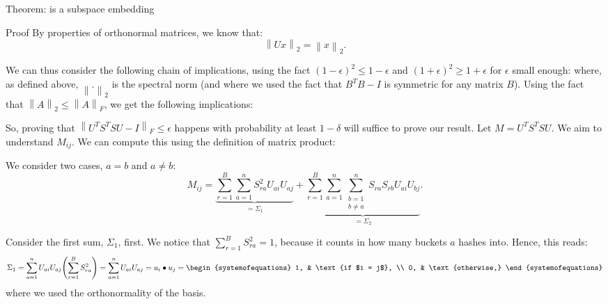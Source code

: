 \documentclass[a4paper]{article}
\begin{document}
\begin{parag}{Theorem:  is a subspace embedding}
\begin{subparag}{Proof}
        By properties of orthonormal matrices, we know that:
        \[\left\|U x\right\|_2 = \left\|x\right\|_2.\]

        We can thus consider the following chain of implications, using the fact $\left(1 - \epsilon\right)^2 \leq 1 - \epsilon$ and $\left(1 + \epsilon\right)^2 \geq 1 + \epsilon$ for $\epsilon$ small enough: 
        where, as defined above, $\left\|.\right\|_2$ is the spectral norm (and where we used the fact that $B^T B - I$ is symmetric for any matrix $B$). Using the fact that $\left\|A\right\|_2 \leq \left\|A\right\|_F$, we get the following implications: 

        So, proving that $\left\|U^T S^T S U - I\right\|_F \leq \epsilon$ happens with probability at least $1 - \delta$ will suffice to prove our result. Let $M = U^T S^T S U$. We aim to understand $M_{ij}$. We can compute this using the definition of matrix product: 

        We consider two cases, $a = b$ and $a \neq b$: 
        \[M_{ij} = \underbrace{\sum_{r=1}^{B} \sum_{a=1}^{n} S_{ra}^2 U_{ai} U_{aj}}_{= \Sigma_1} + \underbrace{\sum_{r=1}^{B} \sum_{a=1}^{n} \sum_{\substack{b = 1 \\ b \neq a}}^{n} S_{ra} S_{rb} U_{ai} U_{bj}}_{= \Sigma_2}.\]

        Consider the first sum, $\Sigma_1$, first. We notice that $\sum_{r=1}^{B} S_{ra}^2 = 1$, because it counts in how many buckets $a$ hashes into. Hence, this reads:
        \[\Sigma_1 = \sum_{a=1}^{n} U_{a i} U_{a j} \left(\sum_{r=1}^{B} S_{ra}^2\right) = \sum_{a=1}^{n} U_{a i} U_{a j} = u_i \dotprod u_j = \begin{systemofequations} 1, & \text{if $i = j$}, \\ 0, & \text{otherwise,} \end{systemofequations}\]
        where we used the orthonormality of the basis.
        

\end{subparag}
\end{parag}
\end{document}
